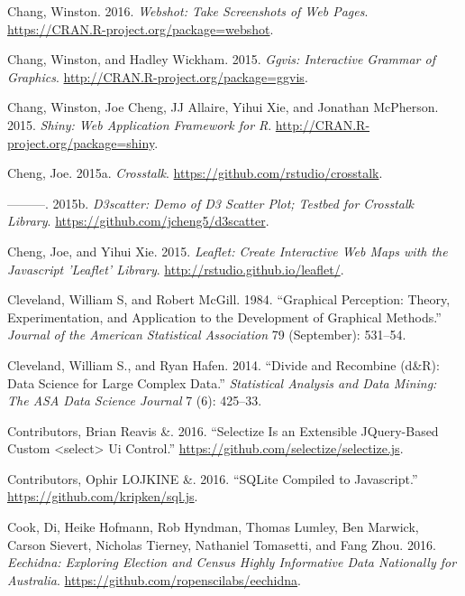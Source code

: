 \documentclass[12pt,]{isuthesis}
\begin{document}
\hypertarget{ref-webshot}{}
Chang, Winston. 2016. \emph{Webshot: Take Screenshots of Web Pages}.
\url{https://CRAN.R-project.org/package=webshot}.

\hypertarget{ref-ggvis}{}
Chang, Winston, and Hadley Wickham. 2015. \emph{Ggvis: Interactive
Grammar of Graphics}. \url{http://CRAN.R-project.org/package=ggvis}.

\hypertarget{ref-shiny}{}
Chang, Winston, Joe Cheng, JJ Allaire, Yihui Xie, and Jonathan
McPherson. 2015. \emph{Shiny: Web Application Framework for R}.
\url{http://CRAN.R-project.org/package=shiny}.

\hypertarget{ref-crosstalk}{}
Cheng, Joe. 2015a. \emph{Crosstalk}.
\url{https://github.com/rstudio/crosstalk}.

\hypertarget{ref-d3scatter}{}
---------. 2015b. \emph{D3scatter: Demo of D3 Scatter Plot; Testbed for
Crosstalk Library}. \url{https://github.com/jcheng5/d3scatter}.

\hypertarget{ref-leaflet}{}
Cheng, Joe, and Yihui Xie. 2015. \emph{Leaflet: Create Interactive Web
Maps with the Javascript 'Leaflet' Library}.
\url{http://rstudio.github.io/leaflet/}.

\hypertarget{ref-graphical-perception}{}
Cleveland, William S, and Robert McGill. 1984. ``Graphical Perception:
Theory, Experimentation, and Application to the Development of Graphical
Methods.'' \emph{Journal of the American Statistical Association} 79
(September): 531--54.

\hypertarget{ref-divide-recombine}{}
Cleveland, William S., and Ryan Hafen. 2014. ``Divide and Recombine
(d\&R): Data Science for Large Complex Data.'' \emph{Statistical
Analysis and Data Mining: The ASA Data Science Journal} 7 (6): 425--33.

\hypertarget{ref-selectizejs}{}
Contributors, Brian Reavis \&. 2016. ``Selectize Is an Extensible
JQuery-Based Custom \textless{}select\textgreater{} Ui Control.''
\url{https://github.com/selectize/selectize.js}.

\hypertarget{ref-SQLjs}{}
Contributors, Ophir LOJKINE \&. 2016. ``SQLite Compiled to Javascript.''
\url{https://github.com/kripken/sql.js}.

\hypertarget{ref-eechidna}{}
Cook, Di, Heike Hofmann, Rob Hyndman, Thomas Lumley, Ben Marwick, Carson
Sievert, Nicholas Tierney, Nathaniel Tomasetti, and Fang Zhou. 2016.
\emph{Eechidna: Exploring Election and Census Highly Informative Data
Nationally for Australia}.
\url{https://github.com/ropenscilabs/eechidna}.
\end{document}
